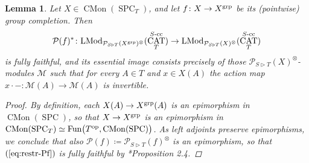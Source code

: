 \documentclass[reqno]{memo-l}
\theoremstyle{mythm}
\newtheorem{lemma}[thm]{Lemma}
\theoremstyle{definition}
\numberwithin{equation}{section}
\newcommand{\Mm}{{\mathcal{M}}}
\DeclareMathOperator{\SPC}{SPC}
\DeclareMathOperator{\CAT}{CAT}
\newcommand{\Fun}{{\textup{Fun}}}
\DeclareMathOperator{\CMon}{CMon}
\newcommand{\op}{{\textup{op}}}
\newcommand{\grp}{\textup{grp}}
\begin{document}
\begin{lemma}
    Let $X\in\CMon(\SPC_T)$, and let $f\colon X\to X^{\grp}$ be its (pointwise) group completion. Then 
    \begin{equation}\label{eq:restr-Pf}
        \mathcal P(f)^*\colon\textup{LMod}_{\mathcal P_{S\triangleright T}(X^{\grp})^{\otimes}}(\CAT_T^\textup{$S$-cc})\to \textup{LMod}_{\mathcal P_{S\triangleright T}(X)^{\otimes}}(\CAT_T^\textup{$S$-cc})
    \end{equation}
    is fully faithful, and its essential image consists precisely of those $\mathcal P_{S\triangleright T}(X)^{\otimes}$-modules $\Mm$ such that for every $A\in T$ and $x\in X(A)$ the action map $x\cdot-\colon\Mm(A)\to\Mm(A)$ is invertible.
    \begin{proof}
        By definition, each $X(A)\to X^\grp(A)$ is an epimorphism in $\CMon(\SPC)$, so that $X\to X^\grp$ is an epimorphism in $\CMon(\SPC_T)\simeq\Fun\big(T^\op,\CMon(\SPC)\big)$. As left adjoints preserve epimorphisms, we conclude that also $\mathcal P(f)\coloneqq \mathcal P_{S\triangleright T}(f)^{\otimes}$ is an epimorphism, so that $(\ref{eq:restr-Pf})$ is fully faithful by \cite{Ro15}*{Proposition 2.4}.
        

\end{proof}
\end{lemma}
\end{document}
